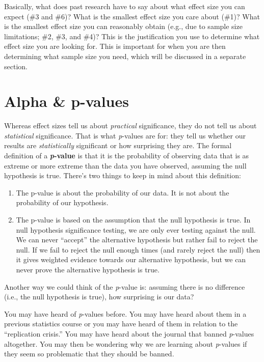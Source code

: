 \documentclass[
]{book}
\providecommand{\tightlist}{%
  \setlength{\itemsep}{0pt}\setlength{\parskip}{0pt}}
\begin{document}
Basically, what does past research have to say about what effect size you can expect (\#3 and \#6)? What is the smallest effect size you care about (\#1)? What is the smallest effect size you can reasonably obtain (e.g., due to sample size limitations; \#2, \#3, and \#4)? This is the justification you use to determine what effect size you are looking for. This is important for when you are then determining what sample size you need, which will be discussed in a separate section.

\hypertarget{alpha-p-values}{%
\section{Alpha \& p-values}\label{alpha-p-values}}

Whereas effect sizes tell us about \emph{practical} significance, they do not tell us about \emph{statistical} significance. That is what \emph{p}-values are for: they tell us whether our results are \emph{statistically} significant or how surprising they are. The formal definition of a \textbf{\emph{p}-value} is that it is the probability of observing data that is as extreme or more extreme than the data you have observed, assuming the null hypothesis is true. There's two things to keep in mind about this definition:

\begin{enumerate}
\def\labelenumi{\arabic{enumi}.}
\tightlist
\item
  The p-value is about the probability of our data. It is not about the probability of our hypothesis.
\item
  The p-value is based on the assumption that the null hypothesis is true. In null hypothesis significance testing, we are only ever testing against the null. We can never ``accept'' the alternative hypothesis but rather fail to reject the null. If we fail to reject the null enough times (and rarely reject the null) then it gives weighted evidence towards our alternative hypothesis, but we can never prove the alternative hypothesis is true.
\end{enumerate}

Another way we could think of the \emph{p}-value is: assuming there is no difference (i.e., the null hypothesis is true), how surprising is our data?

You may have heard of \emph{p}-values before. You may have heard about them in a previous statistics course or you may have heard of them in relation to the ``replication crisis.'' You may have heard about the journal that banned \emph{p}-values altogether. You may then be wondering why we are learning about \emph{p}-values if they seem so problematic that they should be banned.
\end{document}
